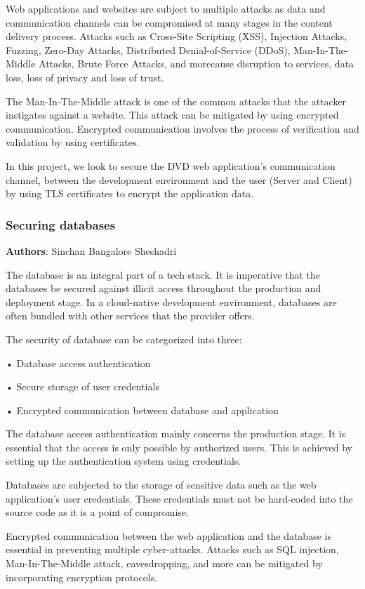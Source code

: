 Web applications and websites are subject to multiple attacks as data and communication channels can be compromised at many stages in the content delivery process. Attacks such as Cross-Site Scripting (XSS), Injection Attacks, Fuzzing, Zero-Day Attacks, Distributed Denial-of-Service (DDoS), Man-In-The-Middle Attacks, Brute Force Attacks, and more\footnotemark \space cause disruption to services, data loss, loss of privacy and loss of trust.

The Man-In-The-Middle attack is one of the common attacks that the attacker instigates against a website. This attack can be mitigated by using encrypted communication. Encrypted communication involves the process of verification and validation by using certificates.

In this project, we look to secure the DVD web application’s communication channel, between the development environment and the user (Server and Client) by using TLS certificates to encrypt the application data.



\subsubsection{Securing databases}
\textbf{Authors}: Sinchan Bangalore Sheshadri

The database is an integral part of a tech stack. It is imperative that the databases be secured against illicit access throughout the production and deployment stage. In a cloud-native development environment, databases are often bundled with other services that the provider offers.

The security of database can be categorized into three:

•	Database access authentication

•	Secure storage of user credentials

•	Encrypted communication between database and application

The database access authentication mainly concerns the production stage. It is essential that the access is only possible by authorized users. This is achieved by setting up the authentication system using credentials.

Databases are subjected to the storage of sensitive data such as the web application’s user credentials. These credentials must not be hard-coded into the source code as it is a point of compromise.

Encrypted communication between the web application and the database is essential in preventing multiple cyber-attacks. Attacks such as SQL injection, Man-In-The-Middle attack, eavesdropping, and more can be mitigated by incorporating encryption protocols.
